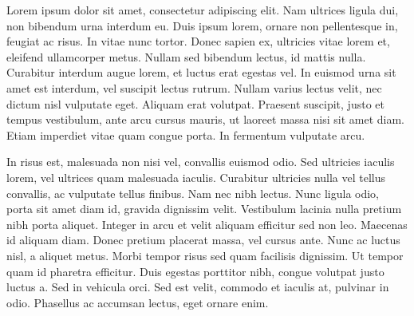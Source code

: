 Lorem ipsum dolor sit amet, consectetur adipiscing elit. Nam ultrices ligula dui, non bibendum urna interdum eu. Duis ipsum lorem, ornare non pellentesque in, feugiat ac risus. In vitae nunc tortor. Donec sapien ex, ultricies vitae lorem et, eleifend ullamcorper metus. Nullam sed bibendum lectus, id mattis nulla. Curabitur interdum augue lorem, et luctus erat egestas vel. In euismod urna sit amet est interdum, vel suscipit lectus rutrum. Nullam varius lectus velit, nec dictum nisl vulputate eget. Aliquam erat volutpat. Praesent suscipit, justo et tempus vestibulum, ante arcu cursus mauris, ut laoreet massa nisi sit amet diam. Etiam imperdiet vitae quam congue porta. In fermentum vulputate arcu.

In risus est, malesuada non nisi vel, convallis euismod odio. Sed ultricies iaculis lorem, vel ultrices quam malesuada iaculis. Curabitur ultricies nulla vel tellus convallis, ac vulputate tellus finibus. Nam nec nibh lectus. Nunc ligula odio, porta sit amet diam id, gravida dignissim velit. Vestibulum lacinia nulla pretium nibh porta aliquet. Integer in arcu et velit aliquam efficitur sed non leo. Maecenas id aliquam diam. Donec pretium placerat massa, vel cursus ante. Nunc ac luctus nisl, a aliquet metus. Morbi tempor risus sed quam facilisis dignissim. Ut tempor quam id pharetra efficitur. Duis egestas porttitor nibh, congue volutpat justo luctus a. Sed in vehicula orci. Sed est velit, commodo et iaculis at, pulvinar in odio. Phasellus ac accumsan lectus, eget ornare enim.